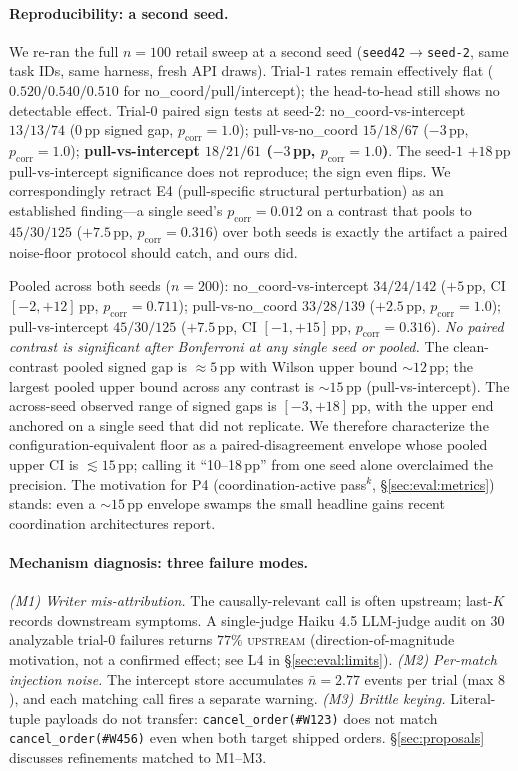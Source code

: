 \paragraph{Reproducibility: a second seed.}
We re-ran the full $n{=}100$ retail sweep at a second seed
(\texttt{seed42$\to$seed-2}, same task IDs, same harness, fresh
API draws). Trial-$1$ rates remain effectively flat
($0.520/0.540/0.510$ for no\_coord/pull/intercept); the
head-to-head still shows no detectable effect. Trial-$0$ paired
sign tests at seed-$2$: no\_coord-vs-intercept $13/13/74$
($0$\,pp signed gap, $p_{\text{corr}}{=}1.0$); pull-vs-no\_coord
$15/18/67$ ($-3$\,pp, $p_{\text{corr}}{=}1.0$);
\textbf{pull-vs-intercept $18/21/61$
($-3$\,pp, $p_{\text{corr}}{=}1.0$)}.  The seed-$1$ $+18$\,pp
pull-vs-intercept significance does not reproduce; the sign
even flips. We correspondingly retract E4 (pull-specific
structural perturbation) as an established finding---a single
seed's $p_{\text{corr}}{=}0.012$ on a contrast that pools to
$45/30/125$ ($+7.5$\,pp, $p_{\text{corr}}{=}0.316$) over both
seeds is exactly the artifact a paired noise-floor protocol
should catch, and ours did.

Pooled across both seeds ($n{=}200$): no\_coord-vs-intercept
$34/24/142$ ($+5$\,pp, CI $[{-}2,{+}12]$\,pp,
$p_{\text{corr}}{=}0.711$); pull-vs-no\_coord $33/28/139$
($+2.5$\,pp, $p_{\text{corr}}{=}1.0$); pull-vs-intercept
$45/30/125$ ($+7.5$\,pp, CI $[{-}1,{+}15]$\,pp,
$p_{\text{corr}}{=}0.316$). \emph{No paired contrast is
significant after Bonferroni at any single seed or pooled.}
The clean-contrast pooled signed gap is $\approx 5$\,pp with
Wilson upper bound $\sim 12$\,pp; the largest pooled upper bound
across any contrast is $\sim 15$\,pp (pull-vs-intercept). The
across-seed observed range of signed gaps is
$[{-}3,{+}18]$\,pp, with the upper end anchored on a single
seed that did not replicate. We therefore characterize the
configuration-equivalent floor as a paired-disagreement
envelope whose pooled upper CI is $\lesssim 15$\,pp; calling
it ``10--18\,pp'' from one seed alone overclaimed the
precision. The motivation for P4 (coordination-active
pass$^k$, \S\ref{sec:eval:metrics}) stands: even a
${\sim}15$\,pp envelope swamps the small headline gains
recent coordination architectures report.

\paragraph{Mechanism diagnosis: three failure modes.}
\emph{(M1) Writer mis-attribution.} The causally-relevant call is
often upstream; last-$K$ records downstream symptoms. A
single-judge Haiku 4.5 LLM-judge audit on $30$ analyzable
trial-$0$ failures returns $77\%$ \textsc{upstream}
(direction-of-magnitude motivation, not a confirmed effect; see
L4 in \S\ref{sec:eval:limits}).
\emph{(M2) Per-match injection noise.} The intercept store
accumulates $\bar{n}{=}2.77$ events per trial (max $8$), and each
matching call fires a separate warning.
\emph{(M3) Brittle keying.} Literal-tuple payloads do not
transfer: \texttt{cancel\_order(\#W123)} does not match
\texttt{cancel\_order(\#W456)} even when both target shipped
orders. \S\ref{sec:proposals} discusses refinements matched
to M1--M3.

